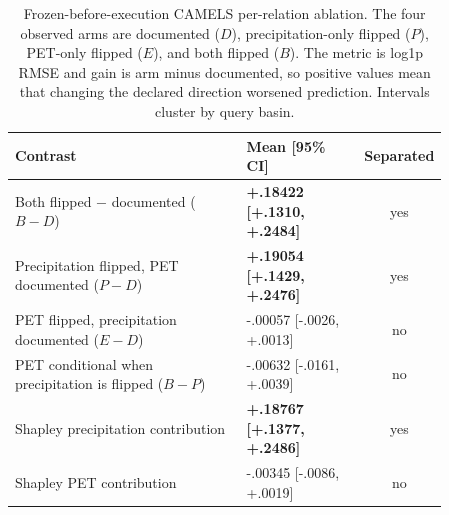 \begin{table}[H]
\caption{Frozen-before-execution CAMELS per-relation ablation. The four observed arms are documented ($D$), precipitation-only flipped ($P$), PET-only flipped ($E$), and both flipped ($B$). The metric is log1p RMSE and gain is arm minus documented, so positive values mean that changing the declared direction worsened prediction. Intervals cluster by query basin.}
\label{tab:app-camels-per-relation}
\centering\scriptsize
\setlength{\tabcolsep}{4pt}
\begin{tabular}{P{0.57\linewidth}P{0.29\linewidth}c}
\toprule Contrast & Mean [95\% CI] & Separated \\
\midrule
Both flipped $-$ documented ($B-D$) & \textbf{+.18422 [+.1310, +.2484]} & yes \\
Precipitation flipped, PET documented ($P-D$) & \textbf{+.19054 [+.1429, +.2476]} & yes \\
PET flipped, precipitation documented ($E-D$) & -.00057 [-.0026, +.0013] & no \\
PET conditional when precipitation is flipped ($B-P$) & -.00632 [-.0161, +.0039] & no \\
Shapley precipitation contribution & \textbf{+.18767 [+.1377, +.2486]} & yes \\
Shapley PET contribution & -.00345 [-.0086, +.0019] & no \\
\bottomrule\end{tabular}
\end{table}
